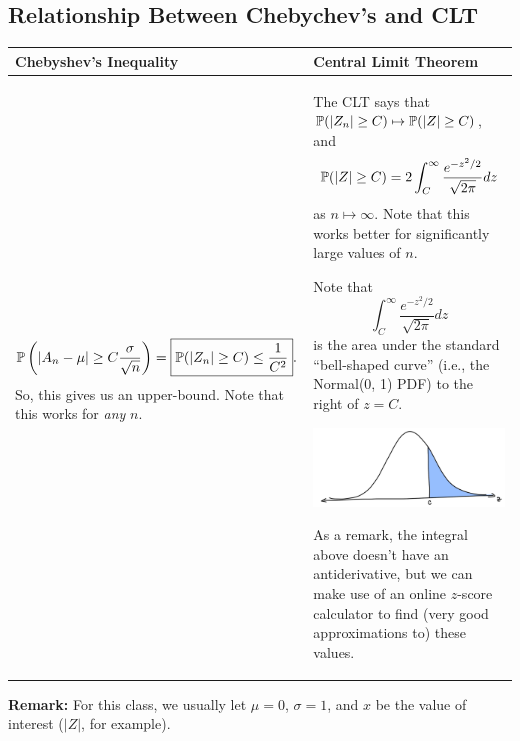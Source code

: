 \subsection{Relationship Between Chebychev's and CLT}
\begin{center}
    \begin{tabular}{||p{3in}|p{3in}||}
        \hline 
        \textbf{Chebyshev's Inequality} & \textbf{Central Limit Theorem} \\ 
        \hline \hline 
        \[\mathbb{P}\left(|A_n - \mu| \geq C \frac{\sigma}{\sqrt{n}}\right) = \boxed{\mathbb{P}(|Z_n| \geq C) \leq \frac{1}{C^2}}.\] 
        So, this gives us an upper-bound. Note that this works for \emph{any} $n$. 
        
        & 
        
        The CLT says that $\mathbb{P}(|Z_n| \geq C) \mapsto \mathbb{P}(|Z| \geq C)$, and 
        \[\mathbb{P}(|Z| \geq C) = 2\int_{C}^{\infty} \frac{e^{-z^2 / 2}}{\sqrt{2\pi}} dz\]
        as $n \mapsto \infty$. Note that this works better for significantly large values of $n$.

        \bigskip 

        Note that \[\int_{C}^{\infty} \frac{e^{-z^2 / 2}}{\sqrt{2\pi}} dz\] is the area under the standard ``bell-shaped curve'' (i.e., the Normal(0, 1) PDF) to the right of $z = C$.
        \begin{center}
            \includegraphics[scale=0.26]{assets/lec20clt.png}
        \end{center}
        As a remark, the integral above doesn't have an antiderivative, but we can make use of an online $z$-score calculator to find (very good approximations to) these values.
        \\ 
        \hline 
    \end{tabular}
\end{center}
\textbf{Remark:} For this class, we usually let $\mu = 0$, $\sigma = 1$, and $x$ be the value of interest ($|Z|$, for example).

